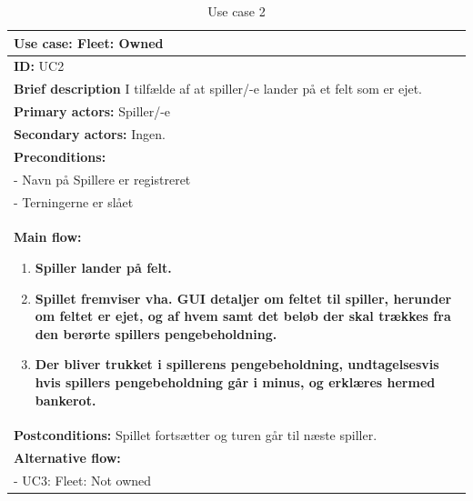 \begin{table}[H]
    \begin{center}
        \begin{tabular}{ | p{15cm} |}
            \hline
            \textbf{Use case:} Fleet: Owned \\ \hline
            \textbf{ID:} UC2 \\ \hline
            \textbf{Brief description} I tilfælde af at spiller/-e lander på et felt som er ejet.    \\ \hline
            \textbf{Primary actors:} Spiller/-e \\ \hline
            \textbf{Secondary actors:} Ingen. \\ \hline
            \textbf{Preconditions:}
            \\- Navn på Spillere er registreret
            \\- Terningerne er slået \\ \hline
            \textbf{Main flow:}
            \begin{enumerate}
                \item \textbf{Spiller lander på felt.}
                \item \textbf{Spillet fremviser vha. GUI detaljer om feltet til spiller, herunder om feltet er ejet, og af hvem samt det beløb der skal trækkes fra den berørte spillers pengebeholdning.}
                \item \textbf{Der bliver trukket i spillerens pengebeholdning, undtagelsesvis hvis spillers pengebeholdning går i minus, og erklæres hermed bankerot.}
            \end{enumerate} \\ \hline
            \textbf{Postconditions:} Spillet fortsætter og turen går til næste spiller.\\ \hline
            \textbf{Alternative flow:}
            \\- UC3: Fleet: Not owned \\ \hline
            \hline
        \end{tabular}
        \caption{Use case 2}
        \label{usecase:2}
    \end{center}
\end{table}

